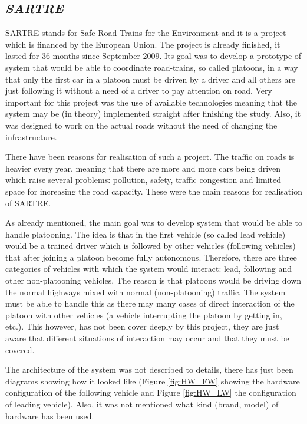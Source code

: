 \subsection{\textit{SARTRE}}\label{sec:SARTRE}

SARTRE \cite{Chan2012ProjectSARTRE} stands for Safe Road Trains for the Environment and it is a project which is financed by the European Union. The project is already finished, it lasted for 36 months since September 2009. Its goal was to develop a prototype of system that would be able to coordinate road-trains, so called platoons, in a way that only the first car in a platoon must be driven by a driver and all others are just following it without a need of a driver to pay attention on road. Very important for this project was the use of available technologies meaning that the system may be (in theory) implemented straight after finishing the study. Also, it was designed to work on the actual roads without the need of changing the infrastructure.\par
% 
There have been reasons for realisation of such a project. The traffic on roads is heavier every year, meaning that there are more and more cars being driven which raise several problems: pollution, safety, traffic congestion and limited space for increasing the road capacity. These were the main reasons for realisation of SARTRE. \par
% 
As already mentioned, the main goal was to develop system that would be able to handle platooning. The idea is that in the first vehicle (so called lead vehicle) would be a trained driver which is followed by other vehicles (following vehicles) that after joining a platoon become fully autonomous. Therefore, there are three categories of vehicles with which the system would interact: lead, following and other non-platooning vehicles. The reason is that platoons would be driving down the normal highways mixed with normal (non-platooning) traffic. The system must be able to handle this as there may many cases of direct interaction of the platoon with other vehicles (a vehicle interrupting the platoon by getting in, etc.). This however, has not been cover deeply by this project, they are just aware that different situations of interaction may occur and that they must be covered.\par
% 
The architecture of the system was not described to details, there has just been diagrams showing how it looked like (Figure \ref{fig:HW_FW} showing the hardware configuration of the following vehicle and Figure \ref{fig:HW_LW} the configuration of leading vehicle). Also, it was not mentioned what kind (brand, model) of hardware has been used.\par
